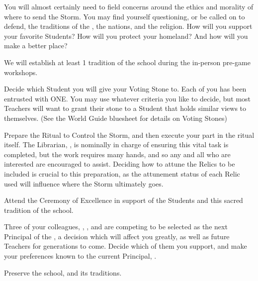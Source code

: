 \documentclass[blue]{GL2020}
\begin{document}
You will almost certainly need to field concerns around the ethics and morality of where to send the Storm. You may find yourself questioning, or be called on to defend, the traditions of the \pSc{}, the nations, and the religion. How will you support your favorite Students? How will you protect your homeland? And how will you make \pEarth{} a better place?

\begin{itemz}[Notes]
	\item We will establish at least 1 tradition of the school during the in-person pre-game workshops.
\end{itemz}

\begin{itemz}[Goals]
    \item Decide which Student you will give your Voting Stone to. Each of you has been entrusted with ONE. You may use whatever criteria you like to decide, but most Teachers will want to grant their stone to a Student that holds similar views to themselves. (See the World Guide bluesheet for details on Voting Stones)
    \item Prepare the Ritual to Control the Storm, and then execute your part in the ritual itself. The Librarian, \cLibrarian{\full}, is nominally in charge of ensuring this vital task is completed, but the work requires many hands, and so any and all who are interested are encouraged to assist. Deciding how to attune the Relics to be included is crucial to this preparation, as the attunement status of each Relic used will influence where the Storm ultimately goes.
    \item Attend the Ceremony of Excellence in support of the Students and this sacred tradition of the school.
    \item Three of your colleagues, \cMusic{\full}, \cBeetle{\full}, and \cChupSecond{\full} are competing to be selected as the next Principal of the \pSc{}, a decision which will affect you greatly, as well as future Teachers for generations to come. Decide which of them you support, and make your preferences known to the current Principal, \cPrincipal{\full}.
    \item Preserve the school, and its traditions.
\end{itemz}
\end{document}

